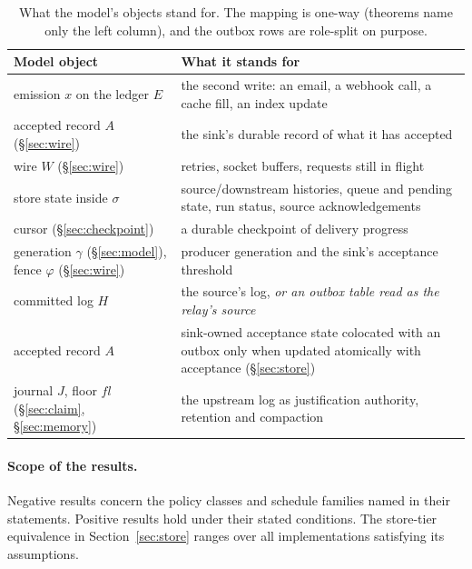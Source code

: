 \documentclass[sigplan,10pt]{acmart}
\theoremstyle{plain}
\theoremstyle{definition}
\begin{document}
\begin{table}[t]
\caption{What the model's objects stand for. The mapping is one-way
(theorems name only the left column), and the outbox rows are
role-split on purpose.}
\label{tab:subst}
\footnotesize
\begin{tabular}{@{}>{\raggedright\arraybackslash}p{}>{\raggedright\arraybackslash}p{}@{}}
\toprule
\textbf{Model object} & \textbf{What it stands for} \\
\midrule
emission $x$ on the ledger $E$ & the second write: an email, a webhook
call, a cache fill, an index update \\
\addlinespace[2pt]
accepted record $A$ (\S\ref{sec:wire}) & the sink's durable record of
what it has accepted \\
\addlinespace[2pt]
wire $W$ (\S\ref{sec:wire}) & retries, socket buffers, requests still
in flight \\
\addlinespace[2pt]
store state inside $\sigma$ & source/downstream histories, queue and
pending state, run status, source acknowledgements \\
\addlinespace[2pt]
cursor (\S\ref{sec:checkpoint}) & a durable checkpoint of delivery
progress \\
\addlinespace[2pt]
generation $\gamma$ (\S\ref{sec:model}), fence $\varphi$
(\S\ref{sec:wire}) & producer
generation and the sink's acceptance threshold \\
\addlinespace[2pt]
committed log $H$ & the source's log, \emph{or an outbox table read
as the relay's source} \\
\addlinespace[2pt]
accepted record $A$ & sink-owned acceptance state colocated with an
outbox only when updated atomically with acceptance
(\S\ref{sec:store}) \\
\addlinespace[2pt]
journal $J$, floor $\mathit{fl}$ (\S\ref{sec:claim},
\S\ref{sec:memory}) & the upstream log as justification authority,
retention and compaction \\
\bottomrule
\end{tabular}
\end{table}

\paragraph{Scope of the results.}
Negative results concern the policy classes and schedule families
named in their statements. Positive results hold under their stated
conditions. The store-tier equivalence in Section~\ref{sec:store}
ranges over all implementations satisfying its assumptions.
\end{document}
